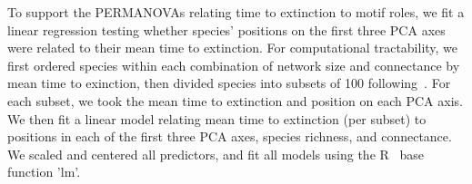 \documentclass[12pt]{article}
\begin{document}



			To support the PERMANOVAs relating time to extinction to motif roles, we fit a linear regression testing whether species' positions on the first three PCA axes were related to their mean time to extinction. For computational tractability, we first ordered species within each combination of network size and connectance by mean time to exinction, then divided species into subsets of 100 following~\citet{Simmons2019}. For each subset, we took the mean time to extinction and position on each PCA axis. We then fit a linear model relating mean time to extinction (per subset) to positions in each of the first three PCA axes, species richness, and connectance. We scaled and centered all predictors, and fit all models using the R~\citep{R} base function 'lm'.
\end{document}
